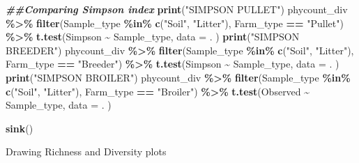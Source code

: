 \documentclass[
]{article}
\newenvironment{Shaded}{\begin{snugshade}}{\end{snugshade}}
\newcommand{\AttributeTok}[1]{\textcolor[rgb]{0.13,0.29,0.53}{#1}}
\newcommand{\DocumentationTok}[1]{\textcolor[rgb]{0.56,0.35,0.01}{\textbf{\textit{#1}}}}
\newcommand{\FunctionTok}[1]{\textcolor[rgb]{0.13,0.29,0.53}{\textbf{#1}}}
\newcommand{\NormalTok}[1]{#1}
\newcommand{\SpecialCharTok}[1]{\textcolor[rgb]{0.81,0.36,0.00}{\textbf{#1}}}
\newcommand{\StringTok}[1]{\textcolor[rgb]{0.31,0.60,0.02}{#1}}
\begin{document}
\begin{Shaded}
\begin{Highlighting}[]
  \DocumentationTok{\#\#Comparing Simpson index}
  \FunctionTok{print}\NormalTok{(}\StringTok{"SIMPSON PULLET"}\NormalTok{)}
\NormalTok{  phycount\_div }\SpecialCharTok{\%\textgreater{}\%}
    \FunctionTok{filter}\NormalTok{(Sample\_type }\SpecialCharTok{\%in\%} \FunctionTok{c}\NormalTok{(}\StringTok{"Soil"}\NormalTok{, }\StringTok{"Litter"}\NormalTok{),}
\NormalTok{           Farm\_type }\SpecialCharTok{==} \StringTok{"Pullet"}\NormalTok{) }\SpecialCharTok{\%\textgreater{}\%}
    \FunctionTok{t.test}\NormalTok{(Simpson }\SpecialCharTok{\textasciitilde{}}\NormalTok{ Sample\_type,}
         \AttributeTok{data =}\NormalTok{ .}
\NormalTok{         )}
  \FunctionTok{print}\NormalTok{(}\StringTok{"SIMPSON BREEDER"}\NormalTok{)}
\NormalTok{  phycount\_div }\SpecialCharTok{\%\textgreater{}\%}
    \FunctionTok{filter}\NormalTok{(Sample\_type }\SpecialCharTok{\%in\%} \FunctionTok{c}\NormalTok{(}\StringTok{"Soil"}\NormalTok{, }\StringTok{"Litter"}\NormalTok{),}
\NormalTok{           Farm\_type }\SpecialCharTok{==} \StringTok{"Breeder"}\NormalTok{) }\SpecialCharTok{\%\textgreater{}\%}
    \FunctionTok{t.test}\NormalTok{(Simpson }\SpecialCharTok{\textasciitilde{}}\NormalTok{ Sample\_type,}
         \AttributeTok{data =}\NormalTok{ .}
\NormalTok{         )}
  \FunctionTok{print}\NormalTok{(}\StringTok{"SIMPSON BROILER"}\NormalTok{)}
\NormalTok{  phycount\_div }\SpecialCharTok{\%\textgreater{}\%}
    \FunctionTok{filter}\NormalTok{(Sample\_type }\SpecialCharTok{\%in\%} \FunctionTok{c}\NormalTok{(}\StringTok{"Soil"}\NormalTok{, }\StringTok{"Litter"}\NormalTok{),}
\NormalTok{           Farm\_type }\SpecialCharTok{==} \StringTok{"Broiler"}\NormalTok{) }\SpecialCharTok{\%\textgreater{}\%}
    \FunctionTok{t.test}\NormalTok{(Observed }\SpecialCharTok{\textasciitilde{}}\NormalTok{ Sample\_type,}
         \AttributeTok{data =}\NormalTok{ .}
\NormalTok{         )}

\FunctionTok{sink}\NormalTok{()}
\end{Highlighting}
\end{Shaded}

Drawing Richness and Diversity plots
\end{document}
